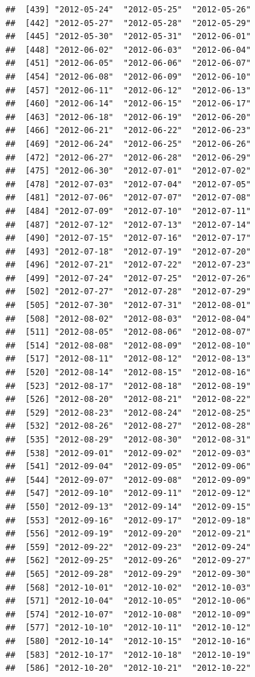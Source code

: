 \documentclass[10pt]{article}\usepackage[]{graphicx}\usepackage[]{color}
\makeatletter
\newenvironment{kframe}{%
 \def\at@end@of@kframe{}%
 \ifinner\ifhmode%
  \def\at@end@of@kframe{\end{minipage}}%
  \begin{minipage}{\columnwidth}%
 \fi\fi%
 \def\FrameCommand##1{\hskip\@totalleftmargin \hskip-\fboxsep
 \colorbox{shadecolor}{##1}\hskip-\fboxsep
     \hskip-\linewidth \hskip-\@totalleftmargin \hskip\columnwidth}%
 \MakeFramed {\advance\hsize-\width
   \@totalleftmargin\z@ \linewidth\hsize
   \@setminipage}}%
 {\par\unskip\endMakeFramed%
 \at@end@of@kframe}
\newenvironment{knitrout}{}{} %
\theoremstyle{plain}
\makeatother
\begin{document}
\begin{knitrout}
\begin{kframe}
\begin{verbatim}
##  [439] "2012-05-24"  "2012-05-25"  "2012-05-26" 
##  [442] "2012-05-27"  "2012-05-28"  "2012-05-29" 
##  [445] "2012-05-30"  "2012-05-31"  "2012-06-01" 
##  [448] "2012-06-02"  "2012-06-03"  "2012-06-04" 
##  [451] "2012-06-05"  "2012-06-06"  "2012-06-07" 
##  [454] "2012-06-08"  "2012-06-09"  "2012-06-10" 
##  [457] "2012-06-11"  "2012-06-12"  "2012-06-13" 
##  [460] "2012-06-14"  "2012-06-15"  "2012-06-17" 
##  [463] "2012-06-18"  "2012-06-19"  "2012-06-20" 
##  [466] "2012-06-21"  "2012-06-22"  "2012-06-23" 
##  [469] "2012-06-24"  "2012-06-25"  "2012-06-26" 
##  [472] "2012-06-27"  "2012-06-28"  "2012-06-29" 
##  [475] "2012-06-30"  "2012-07-01"  "2012-07-02" 
##  [478] "2012-07-03"  "2012-07-04"  "2012-07-05" 
##  [481] "2012-07-06"  "2012-07-07"  "2012-07-08" 
##  [484] "2012-07-09"  "2012-07-10"  "2012-07-11" 
##  [487] "2012-07-12"  "2012-07-13"  "2012-07-14" 
##  [490] "2012-07-15"  "2012-07-16"  "2012-07-17" 
##  [493] "2012-07-18"  "2012-07-19"  "2012-07-20" 
##  [496] "2012-07-21"  "2012-07-22"  "2012-07-23" 
##  [499] "2012-07-24"  "2012-07-25"  "2012-07-26" 
##  [502] "2012-07-27"  "2012-07-28"  "2012-07-29" 
##  [505] "2012-07-30"  "2012-07-31"  "2012-08-01" 
##  [508] "2012-08-02"  "2012-08-03"  "2012-08-04" 
##  [511] "2012-08-05"  "2012-08-06"  "2012-08-07" 
##  [514] "2012-08-08"  "2012-08-09"  "2012-08-10" 
##  [517] "2012-08-11"  "2012-08-12"  "2012-08-13" 
##  [520] "2012-08-14"  "2012-08-15"  "2012-08-16" 
##  [523] "2012-08-17"  "2012-08-18"  "2012-08-19" 
##  [526] "2012-08-20"  "2012-08-21"  "2012-08-22" 
##  [529] "2012-08-23"  "2012-08-24"  "2012-08-25" 
##  [532] "2012-08-26"  "2012-08-27"  "2012-08-28" 
##  [535] "2012-08-29"  "2012-08-30"  "2012-08-31" 
##  [538] "2012-09-01"  "2012-09-02"  "2012-09-03" 
##  [541] "2012-09-04"  "2012-09-05"  "2012-09-06" 
##  [544] "2012-09-07"  "2012-09-08"  "2012-09-09" 
##  [547] "2012-09-10"  "2012-09-11"  "2012-09-12" 
##  [550] "2012-09-13"  "2012-09-14"  "2012-09-15" 
##  [553] "2012-09-16"  "2012-09-17"  "2012-09-18" 
##  [556] "2012-09-19"  "2012-09-20"  "2012-09-21" 
##  [559] "2012-09-22"  "2012-09-23"  "2012-09-24" 
##  [562] "2012-09-25"  "2012-09-26"  "2012-09-27" 
##  [565] "2012-09-28"  "2012-09-29"  "2012-09-30" 
##  [568] "2012-10-01"  "2012-10-02"  "2012-10-03" 
##  [571] "2012-10-04"  "2012-10-05"  "2012-10-06" 
##  [574] "2012-10-07"  "2012-10-08"  "2012-10-09" 
##  [577] "2012-10-10"  "2012-10-11"  "2012-10-12" 
##  [580] "2012-10-14"  "2012-10-15"  "2012-10-16" 
##  [583] "2012-10-17"  "2012-10-18"  "2012-10-19" 
##  [586] "2012-10-20"  "2012-10-21"  "2012-10-22" 

\end{verbatim}
\end{kframe}
\end{knitrout}
\end{document}
